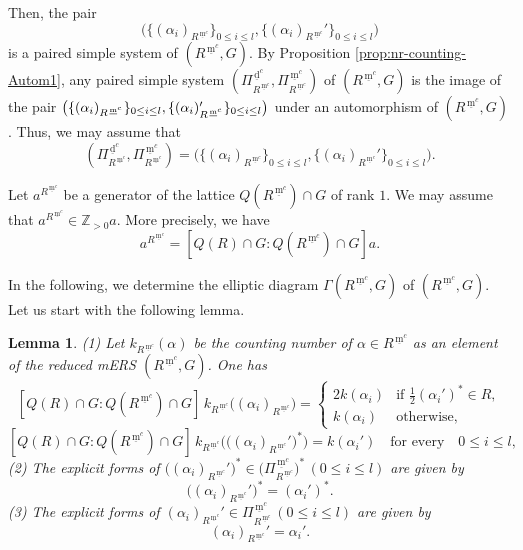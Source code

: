 \documentclass[11pt]{amsart}
\newcommand{\Z}{\mathbb{Z}}
\newcommand{\dc}{\,\underline{\mathrm{d}}^c}
\newcommand{\mc}{\, \underline{\mathrm{m}}^c}
\newtheorem{lemma}[thm]{Lemma}%
\begin{document}
{Then, the pair
\[\big(\{(\alpha_i)_{R^{\mc}}\}_{0\leq i\leq l},
\{(\alpha_i)_{R^{\mc}}'\}_{0\leq i\leq l}\big)\] 
is a paired simple system of $(R^{\mc},G)$. 
By Proposition \ref{prop:nr-counting-Autom1}, any paired simple 
system $(\Pi^{\dc}_{R^{\mc}},\Pi^{\mc}_{R^{\mc}})$ of $(R^{\mc},G)$
is the image of the pair $\big(\{(\alpha_i)_{R^{\mc}}\}_{0\leq i\leq l}, \\
\{(\alpha_i)_{R^{\mc}}'\}_{0\leq i\leq l}\big)$ under an automorphism of $(R^{\mc},G)$.
Thus, we may assume that 
\[(\Pi^{\dc}_{R^{\mc}},\Pi^{\mc}_{R^{\mc}})
=\big(\{(\alpha_i)_{R^{\mc}}\}_{0\leq i\leq l},
\{(\alpha_i)_{R^{\mc}}'\}_{0\leq i\leq l}\big).\]

Let $a^{R^{\mc}}$ be a generator of the lattice $Q(R^{\mc})\cap G$ of rank $1$. 
We may assume that $a^{R^{\mc}}\in \Z_{>0}a$. 
More precisely, we have
\begin{equation}\label{eq:a-Rmc}
a^{R^{\mc}}=[Q(R)\cap G:Q(R^{\mc})\cap G]a.
\end{equation}
\vskip 5mm

In the following, we determine the elliptic diagram $\Gamma(R^{\mc},G)$ of 
$(R^{\mc},G)$. Let us start with the following lemma.

\begin{lemma}\label{lemma:Gamma(R'',G)}
{\rm (1)} Let $k_{R^{\mc}}(\alpha)$ be the counting number of 
$\alpha\in R^{\mc}$ as an element of the reduced mERS $(R^{\mc},G)$. One has
\begin{equation}\label{eq:counting-Rmc-1}
[Q(R)\cap G:Q(R^{\mc})\cap G]\,
k_{R^{\mc}}\big((\alpha_i)_{R^{\mc}}\big)=\begin{cases}
2k(\alpha_i) & \text{if $\frac12 (\alpha_i')^\ast\in R$},\\
k(\alpha_i) & \text{otherwise},
\end{cases}
\end{equation}
\begin{equation}\label{eq:counting-Rmc-2}
[Q(R)\cap G:Q(R^{\mc})\cap G]\,
k_{R^{\mc}}\big(\big((\alpha_i)_{R^{\mc}}'\big)^\ast\big)=
k(\alpha_i')\quad\text{for every}\quad 0\leq i\leq l, 
\end{equation}
{\rm (2)} The explicit forms of $\big((\alpha_i)_{R^{\mc}}'\big)^\ast\in 
\big(\Pi^{\mc}_{R^{\mc}}\big)^\ast\, (0\leq i\leq l)$ are given by
\[\big((\alpha_i)_{R^{\mc}}'\big)^\ast=
(\alpha_i')^\ast.\]
{\rm (3)} The explicit forms of 
$(\alpha_i)_{R^{\mc}}'\in \Pi^{\mc}_{R^{\mc}}\, (0\leq i\leq l)$ 
are given by
\[(\alpha_i)_{R^{\mc}}'=\alpha_i'.\]
\end{lemma}

}
\end{document}
